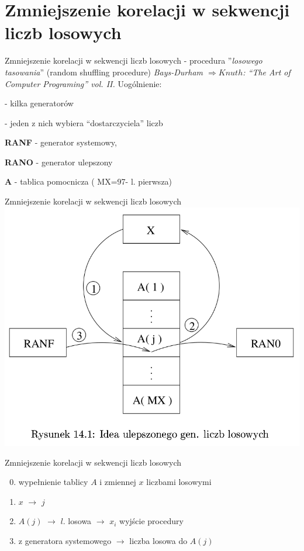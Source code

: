 \section{Zmniejszenie korelacji w sekwencji liczb losowych}
	\begin{frame}{Zmniejszenie korelacji w sekwencji liczb losowych}
	- procedura ''{\it losowego tasowania}'' (random shuffling procedure) {\it Bays-Durham 	$\Rightarrow Knuth$: ``The Art of Computer 	Programing'' vol. II.} 
	\newline \newline
	Uogólnienie:

	- kilka generatorów

	- jeden z nich wybiera ``dostarczyciela'' liczb

	\textbf{RANF} - generator systemowy,

	\textbf{RANO} - generator ulepszony

	\textbf{A} - tablica pomocnicza ( MX=97- l. pierwsza)

	\end{frame}
    
	\begin{frame}{Zmniejszenie korelacji w sekwencji liczb losowych}
		\centering \includegraphics[width=.8\linewidth]{img/14/14_5_1_img.png}
	\end{frame}

	\begin{frame}{Zmniejszenie korelacji w sekwencji liczb losowych}
		\begin{enumerate}
			\setcounter{enumi}{-1}
			\item wypełnienie tablicy $A$ i zmiennej $x$ liczbami losowymi
			\item $x$ $\rightarrow$ $j$
			\item $A(j)$ $\rightarrow$ $l$. losowa $\rightarrow$ $x_{i}$ wyjście procedury
			\item z generatora systemowego $\rightarrow$ liczba losowa do $A(j)$
		\end{enumerate}
	\end{frame}


